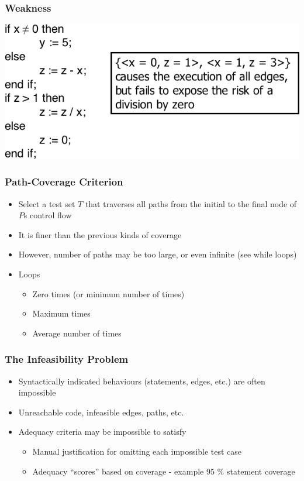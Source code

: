 \documentclass[t,12pt,numbers,fleqn]{beamer}
\begin{document}
\begin{frame}
\frametitle{Weakness}

\includegraphics[scale=0.5]{../Figures/WeaknessConditionCoverage.png}

\end{frame}


\begin{frame}
\frametitle{Path-Coverage Criterion}

\begin{itemize}
\item Select a test set $T$ that traverses all paths from the initial to the final node of $P$s control flow
\item It is finer than the previous kinds of coverage
\item However, number of paths may be too large, or even infinite (see while loops)
\item Loops
\begin{itemize}
\item Zero times (or minimum number of times)
\item Maximum times
\item Average number of times
\end{itemize}
\end{itemize}

\end{frame}


\begin{frame}
\frametitle{The Infeasibility Problem}

\begin{itemize}
\item Syntactically indicated behaviours (statements, edges, etc.) are often impossible
\item Unreachable code, infeasible edges, paths, etc.
\item Adequacy criteria may be impossible to satisfy
\begin{itemize}
\item Manual justification for omitting each impossible test case
\item Adequacy ``scores'' based on coverage - example 95 \% statement coverage
\end{itemize}
\end{itemize}

\end{frame}
\end{document}
